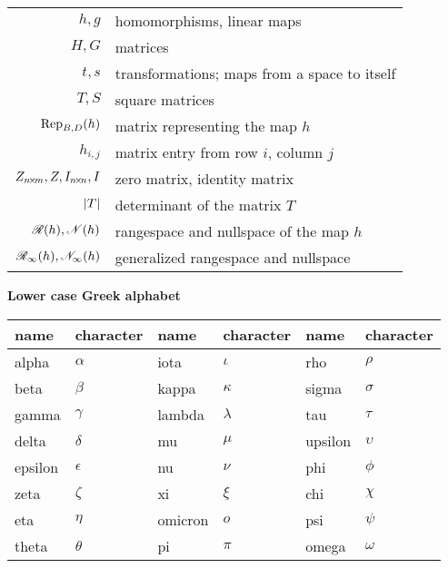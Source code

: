 \begin{center}
\begin{tabular}{r|l}
    \( h,g \)              &homomorphisms, linear maps                \\
    \( H,G \)              &matrices                                  \\
    \( t,s \)              &transformations; maps from a space to itself \\
    \( T,S \)              &square matrices                           \\
    \( \rep{h}{B,D} \)     &matrix representing the map \( h \)       \\
    \( h_{i,j} \)          &matrix entry from row \( i \),
                              column \( j \)                      \\
    \( Z_{\nbym{n}{m}},Z,I_{\nbyn{n}},I \)        &zero matrix, identity matrix    \\
    \( \deter{T} \)        &determinant of the matrix \( T \)         \\
    \( \rangespace{h},\nullspace{h} \)
                           &rangespace and nullspace of the map \( h \) \\
    \( \genrangespace{h},\gennullspace{h} \)
                           &generalized rangespace and nullspace
  \end{tabular}
\end{center}
\vfill
\begin{center}
  \textbf{Lower case Greek alphabet}
\end{center}
\begin{center}
  \begin{tabular}{ll|ll|ll}
     name    &character      &name   &character     &name   &character \\ 
    \hline
     alpha   &\( \alpha  \)  &iota   &\( \iota   \) &rho    &\( \rho    \) \\
     beta    &\( \beta   \)  &kappa  &\( \kappa  \) &sigma  &\( \sigma  \) \\
     gamma   &\( \gamma  \)  &lambda &\( \lambda \) &tau    &\( \tau    \) \\
     delta   &\( \delta  \)  &mu     &\( \mu     \) &upsilon&\( \upsilon\) \\
     epsilon &\( \epsilon\)  &nu     &\( \nu     \) &phi    &\( \phi    \) \\
     zeta    &\( \zeta   \)  &xi     &\( \xi     \) &chi    &\( \chi    \) \\
     eta     &\( \eta    \)  &omicron&\( o       \) &psi    &\( \psi    \) \\
     theta   &\( \theta  \)  &pi     &\( \pi     \) &omega  &\( \omega  \)
  \end{tabular}
\end{center}
\vfill
\par{}
%
